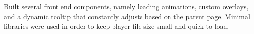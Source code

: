 \documentclass[]{deedy-resume-openfont}
\begin{document}
\begin{minipage}[t]{0.66\textwidth}
Built several front end components, namely loading animations, custom overlays, and a dynamic tooltip that constantly adjusts based on the parent page. Minimal libraries were used in order to keep player file size small and quick to load.
\sectionsep

\end{minipage} 
\end{document}
